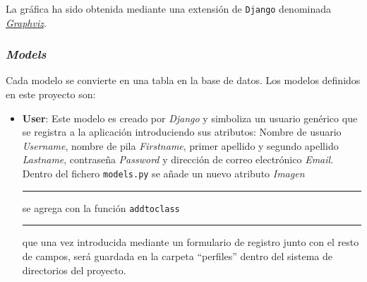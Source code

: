 \documentclass[a4paper, 12pt]{book}
\begin{document}
La gr\'afica ha sido obtenida mediante una extensi\'on de \texttt{Django} denominada 
\href{https://code.djangoproject.com/wiki/DjangoGraphviz}{\textit{Graphviz}}.

\subsubsection{\textit{Models}} 
\label{sec:models}
Cada modelo se convierte en una tabla en la base de datos. Los modelos definidos en este proyecto son:

\begin{itemize}
  \item {\bfseries User}: Este modelo es creado por \textit{Django} y simboliza un usuario gen\'erico que se registra a la aplicaci\'on introduciendo sus 
  atributos: Nombre de usuario \textit{Username}, nombre de pila \textit{Firstname}, primer apellido y segundo apellido \textit{Lastname}, contrase\~na 
  \textit{Password} 
  y direcci\'on de correo electr\'onico \textit{Email}. Dentro del fichero \texttt{models.py} se a\~nade un nuevo atributo \textit{Imagen} 
  \rule[1mm]{4mm}{0.1mm}se agrega con la funci\'on \texttt{addtoclass}\rule[1mm]{4mm}{0.1mm} que una vez introducida mediante un formulario de registro 
  junto con el resto de campos, ser\'a guardada en la carpeta ``perfiles'' dentro del sistema de directorios del proyecto. 
  

\end{itemize}
\end{document}
